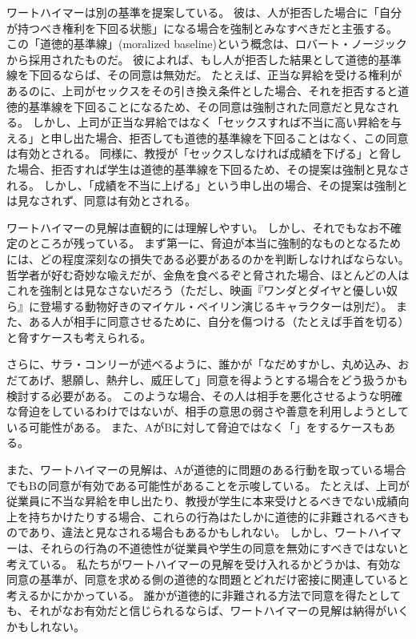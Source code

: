 \documentclass[paper=a4,book,openany]{jlreq}
\newcommand{\ig}[1]{}           %
\begin{document}
ワートハイマーは別の基準を提案している。
彼は、人が拒否した場合に「自分が持つべき権利を下回る状態」になる場合を強制とみなすべきだと主張する。
この「道徳的基準線」(moralized baseline)という概念は、ロバート・ノージック\ig{Robert Nozick}から採用されたものだ。
彼によれば、もし人が拒否した結果として道徳的基準線を下回るならば、その同意は無効だ\citep[pp. 167--169]{wertheimer03:_consen_sexual_relat}。
たとえば、正当な昇給を受ける権利があるのに、上司がセックスをその引き換え条件とした場合、それを拒否すると道徳的基準線を下回ることになるため、その同意は強制された同意だと見なされる。
しかし、上司が正当な昇給ではなく「セックスすれば不当に高い昇給を与える」と申し出た場合、拒否しても道徳的基準線を下回ることはなく、この同意は有効とされる。
同様に、教授が「セックスしなければ成績を下げる」と脅した場合、拒否すれば学生は道徳的基準線を下回るため、その提案は強制と見なされる。
しかし、「成績を不当に上げる」という申し出の場合、その提案は強制とは見なされず、同意は有効とされる。

ワートハイマーの見解は直観的には理解しやすい。
しかし、それでもなお不確定のところが残っている。
まず第一に、脅迫が本当に強制的なものとなるためには、どの程度深刻なの損失である必要があるのかを判断しなければならない。
哲学者が好む奇妙な喩えだが、金魚を食べるぞと脅された場合、ほとんどの人はこれを強制とは見なさないだろう（ただし、映画『ワンダとダイヤと優しい奴ら』に登場する動物好きのマイケル・ペイリン演じるキャラクターは別だ）。
また、ある人が相手に同意させるために、自分を傷つける（たとえば手首を切る）と脅すケースも考えられる\citep[p.280]{husak06:_compl_guide_consen_sex}。

さらに、サラ・コンリーが述べるように、誰かが「なだめすかし、丸め込み、おだてあげ、懇願し、熱弁し、威圧して」同意を得ようとする場合をどう扱うかも検討する必要がある\citep[p.115]{conly04:seductionrapecoercion}。
このような場合、その人は相手を悪化させるような明確な脅迫をしているわけではないが、相手の意思の弱さや善意を利用しようとしている可能性がある。
また、AがBに対して脅迫ではなく「」をするケースもある。

また、ワートハイマーの見解は、Aが道徳的に問題のある行動を取っている場合でもBの同意が有効である可能性があることを示唆している。
たとえば、上司が従業員に不当な昇給を申し出たり、教授が学生に本来受けとるべきでない成績向上を持ちかけたりする場合、これらの行為はたしかに道徳的に非難されるべきものであり、違法と見なされる場合もあるかもしれない。
しかし、ワートハイマーは、それらの行為の不道徳性が従業員や学生の同意を無効にすべきではないと考えている。
私たちがワートハイマーの見解を受け入れるかどうかは、有効な同意の基準が、同意を求める側の道徳的な問題とどれだけ密接に関連していると考えるかにかかっている。
誰かが道徳的に非難される方法で同意を得たとしても、それがなお有効だと信じられるならば、ワートハイマーの見解は納得がいくかもしれない。
\end{document}
